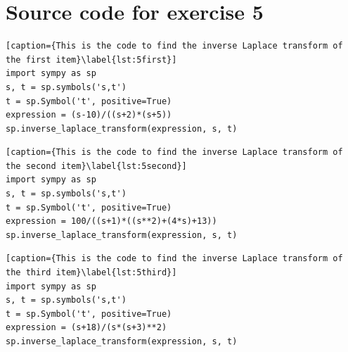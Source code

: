\documentclass[a4paper,11pt]{article}
\begin{document}
\section{Source code for exercise 5}
\begin{lstlisting}[caption={This is the code to find the inverse Laplace transform of the first item}\label{lst:5first}]
import sympy as sp
s, t = sp.symbols('s,t')
t = sp.Symbol('t', positive=True)
expression = (s-10)/((s+2)*(s+5))
sp.inverse_laplace_transform(expression, s, t)
\end{lstlisting}
\begin{lstlisting}[caption={This is the code to find the inverse Laplace transform of the second item}\label{lst:5second}]
import sympy as sp
s, t = sp.symbols('s,t')
t = sp.Symbol('t', positive=True)
expression = 100/((s+1)*((s**2)+(4*s)+13))
sp.inverse_laplace_transform(expression, s, t)
\end{lstlisting}
\begin{lstlisting}[caption={This is the code to find the inverse Laplace transform of the third item}\label{lst:5third}]
import sympy as sp
s, t = sp.symbols('s,t')
t = sp.Symbol('t', positive=True)
expression = (s+18)/(s*(s+3)**2)
sp.inverse_laplace_transform(expression, s, t)
\end{lstlisting}
\end{document}
